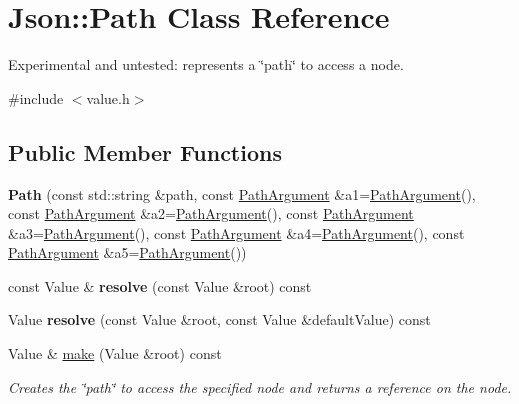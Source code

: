 \hypertarget{class_json_1_1_path}{\section{Json\-:\-:Path Class Reference}
\label{class_json_1_1_path}
}


Experimental and untested\-: represents a \char`\"{}path\char`\"{} to access a node.  




{\ttfamily \#include $<$value.\-h$>$}

\subsection*{Public Member Functions}
\begin{DoxyCompactItemize}
\item 
\hypertarget{class_json_1_1_path_aaa37a99650e770d0cd680bf53585ec99}{{\bfseries Path} (const std\-::string \&path, const \hyperlink{class_json_1_1_path_argument}{Path\-Argument} \&a1=\hyperlink{class_json_1_1_path_argument}{Path\-Argument}(), const \hyperlink{class_json_1_1_path_argument}{Path\-Argument} \&a2=\hyperlink{class_json_1_1_path_argument}{Path\-Argument}(), const \hyperlink{class_json_1_1_path_argument}{Path\-Argument} \&a3=\hyperlink{class_json_1_1_path_argument}{Path\-Argument}(), const \hyperlink{class_json_1_1_path_argument}{Path\-Argument} \&a4=\hyperlink{class_json_1_1_path_argument}{Path\-Argument}(), const \hyperlink{class_json_1_1_path_argument}{Path\-Argument} \&a5=\hyperlink{class_json_1_1_path_argument}{Path\-Argument}())}\label{class_json_1_1_path_aaa37a99650e770d0cd680bf53585ec99}

\item 
\hypertarget{class_json_1_1_path_ae1d05fa985a6ee3c57f2b8ed186b5982}{const Value \& {\bfseries resolve} (const Value \&root) const }\label{class_json_1_1_path_ae1d05fa985a6ee3c57f2b8ed186b5982}

\item 
\hypertarget{class_json_1_1_path_a33d1749770a4cf74e9a3de419bc7febe}{Value {\bfseries resolve} (const Value \&root, const Value \&default\-Value) const }\label{class_json_1_1_path_a33d1749770a4cf74e9a3de419bc7febe}

\item 
\hypertarget{class_json_1_1_path_a5289901fc58ad1fdca1de7fb5a0b620c}{Value \& \hyperlink{class_json_1_1_path_a5289901fc58ad1fdca1de7fb5a0b620c}{make} (Value \&root) const }\label{class_json_1_1_path_a5289901fc58ad1fdca1de7fb5a0b620c}

\begin{DoxyCompactList}\small\item\em Creates the \char`\"{}path\char`\"{} to access the specified node and returns a reference on the node. \end{DoxyCompactList}\end{DoxyCompactItemize}


